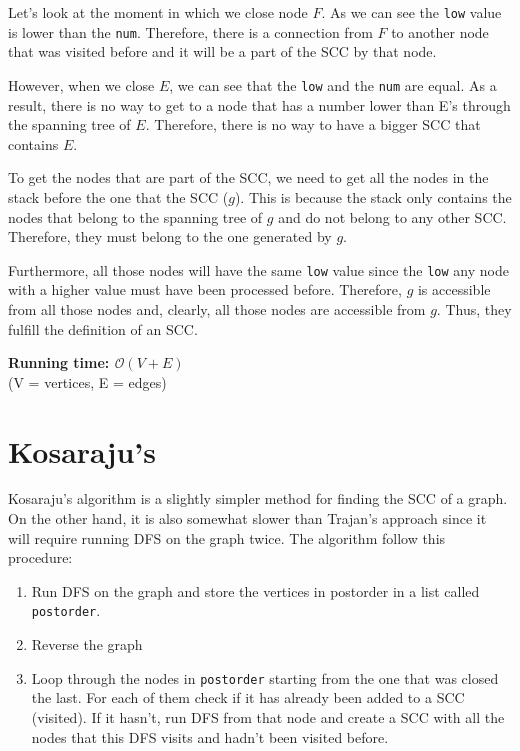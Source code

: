 Let's look  at the moment in which we close node $F$. As we can see the \texttt{low}
value is lower than the \texttt{num}. Therefore, there is a connection from $F$ to
another node that was visited before and it will be a part of the SCC 
by that node.

However, when we close $E$, we can see that the \texttt{low} and the \texttt{num}
are equal. As a result, there is no way to get to a node that has a number lower than
E's through the spanning tree of $E$. Therefore, there is no way to have a bigger 
SCC that contains $E$.

To get the nodes that are part of the SCC, we need to get all the nodes in the stack before
the one that  the SCC ($g$). This is because the stack only contains the 
nodes that belong to the spanning tree of $g$ and do not belong to any other SCC. 
Therefore, they must belong to the one generated by $g$. 

Furthermore, all those nodes will have the same \texttt{low} value since the \texttt{low}
any node with a higher value must have been processed before. Therefore, $g$ is accessible
from all those nodes and, clearly, all those nodes are accessible from $g$.
Thus, they fulfill the definition of an SCC.



\newpage
{}
\noindent \textbf{\boldmath Running time: $\mathcal{O}(V+E)$}
\\ {\small (V = vertices, E = edges)}

\section{Kosaraju's}
Kosaraju's algorithm is a slightly simpler method for finding the SCC of a graph. 
On the other hand, it is also somewhat slower than Trajan's approach since it will
require running DFS on the graph twice. The algorithm follow this procedure:
\begin{enumerate}
	\item Run DFS on the graph and store the vertices in postorder in a list 
		called \texttt{postorder}.
	\item Reverse the graph
	\item Loop through the nodes in \texttt{postorder} starting from the one that 
		was closed the last. For each of them check if it has already been 
		added to a SCC (visited). If it hasn't, run DFS from that node and
		create a SCC with all the nodes that this DFS visits and hadn't been
		visited before.
\end{enumerate}
